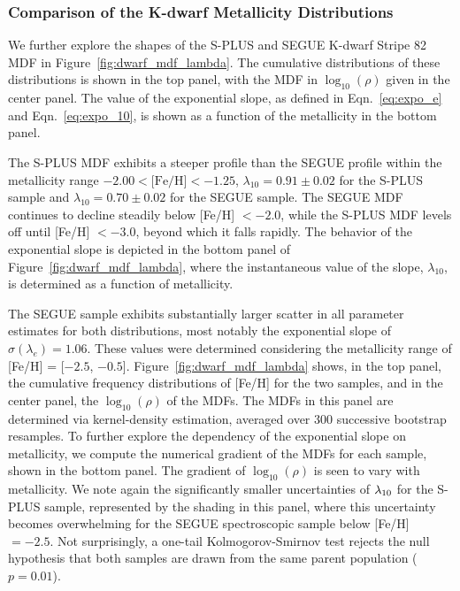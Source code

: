 \documentclass[twocolumn,trackchanges]{aastex63}
\begin{document}

\subsubsection{Comparison of the K-dwarf Metallicity Distributions}

We further explore the shapes of the S-PLUS and SEGUE K-dwarf Stripe 82 MDF in Figure~\ref{fig:dwarf_mdf_lambda}. The cumulative distributions of these distributions is shown in the top panel, with the MDF in $\log_{10}(\rho)$ given in the center panel. The value of the exponential slope, as defined in Eqn.~\ref{eq:expo_e} and Eqn.~\ref{eq:expo_10}, is shown as a function of the metallicity in the bottom panel.

The S-PLUS MDF exhibits a steeper profile than the SEGUE profile within the metallicity range $-2.00 < \textrm{[Fe/H]} < -1.25$, $\lambda_{10} = 0.91\pm0.02$ for the S-PLUS sample and $\lambda_{10} = 0.70\pm0.02$ for the SEGUE sample. The SEGUE MDF continues to decline steadily below [Fe/H] $<-2.0$, while the S-PLUS MDF levels off until [Fe/H] $<-3.0$, beyond which it falls rapidly. The behavior of the exponential slope is depicted in the bottom panel of Figure~\ref{fig:dwarf_mdf_lambda}, where the instantaneous value of the slope, $\lambda_{10}$, is determined as a function of metallicity. 

 The SEGUE sample exhibits substantially larger scatter in all parameter estimates for both distributions, most notably the exponential slope of $\sigma(\lambda_{e}) = 1.06$. These values were determined considering the metallicity range of [Fe/H] = [$-2.5$, $-0.5$].  Figure~\ref{fig:dwarf_mdf_lambda} shows, in the top panel, the cumulative frequency distributions of [Fe/H] for the two samples, and in the center panel, the $\log_{10}(\rho)$ of the MDFs. The MDFs in this panel are determined via kernel-density estimation, averaged over 300 successive bootstrap resamples. To further explore the dependency of the exponential slope on metallicity, we compute the numerical gradient of the MDFs for each sample, shown in the bottom panel.  The gradient of $\log_{10}(\rho)$ is seen to vary with metallicity. We note again the significantly smaller uncertainties of $\lambda_{\rm 10}$ for the S-PLUS sample, represented by the shading in this panel, where this uncertainty becomes overwhelming for the SEGUE spectroscopic sample below [Fe/H] $=-2.5$.
Not surprisingly, a one-tail Kolmogorov-Smirnov 
test rejects the null hypothesis that both samples are drawn from the same parent population ($p = 0.01$). 
\end{document}
